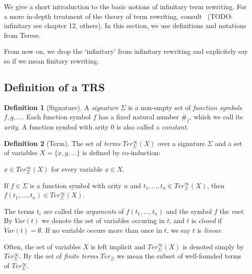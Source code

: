 \documentclass[11pt,oneside,a4paper,final]{report}
\theoremstyle{definition}
\newtheorem{definition}{Definition}
\begin{document}

We give a short introduction to the basic notions of infinitary term
rewriting. For a more in-depth treatment of the theory of term rewriting,
consult~\cite{terese-03} (TODO: infinitary see chapter 12, others). In this
section, we use definitions and notations from Terese.

From now on, we drop the `infinitary' from infinitary rewriting and
explicitely say so if we mean finitary rewriting.


\subsection{Definition of a TRS}

\begin{definition}[Signature]
A \emph{signature} $\Sigma$ is a non-empty set of \emph{function symbols} $f,
g, \ldots$. Each function symbol $f$ has a fixed natural number $\#_f$, which
we call its \emph{arity}. A function symbol with arity $0$ is also called a
\emph{constant}.
\end{definition}

\begin{definition}[Term]
The set of \emph{terms} $Ter_\Sigma^\infty(X)$ over a signature $\Sigma$ and a
set of variables $X = \{x, y, \ldots\}$ is defined by co-induction:
\begin{compactenum}
  \item
    $x \in Ter_\Sigma^\infty(X)$ for every variable $x \in X$.
  \item
    If $f \in \Sigma$ is a function symbol with arity $n$ and $t_1, \ldots,
    t_n \in Ter_\Sigma^\infty(X)$, then $f(t_1, \ldots, t_n) \in
    Ter_\Sigma^\infty(X)$.
\end{compactenum}
\end{definition}

The terms $t_i$ are called the \emph{arguments} of $f(t_1, \ldots, t_n)$ and
the symbol $f$ the \emph{root}. By $Var(t)$ we denote the set of variables
occuring in $t$, and $t$ is \emph{closed} if $Var(t) = \emptyset$. If no
variable occurs more than once in $t$, we say $t$ is \emph{linear}.

Often, the set of variables $X$ is left implicit and $Ter_\Sigma^\infty(X)$ is
denoted simply by $Ter_\Sigma^\infty$. By the set of \emph{finite terms}
$Ter_\Sigma$ we mean the subset of well-founded terms of $Ter_\Sigma^\infty$.
\end{document}
